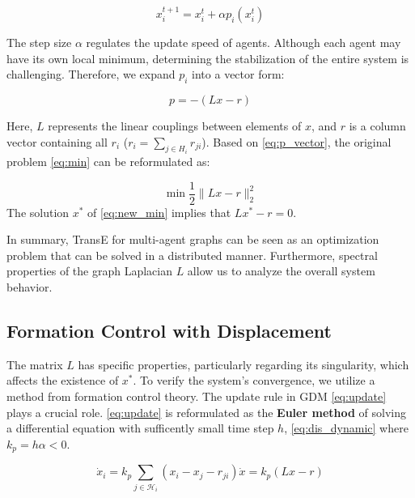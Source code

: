 \documentclass[letterpaper, 10 pt, conference]{ieeeconf}  %
\begin{document}
\begin{equation}
    x_{i}^{t+1} = x_i^t + \alpha p_i(x_i^t)
    \label{eq:update}
\end{equation}

The step size \( \alpha \) regulates the update speed of agents. Although each agent may have its own local minimum, determining the stabilization of the entire system is challenging. Therefore, we expand \( p_i \) into a vector form:

\begin{equation}
    p = - (Lx - r)
    \label{eq:p_vector}
\end{equation}

Here, \( L \) represents the linear couplings between elements of \( x \), and \( r \) is a column vector containing all \( r_i \) (\( r_i = \sum_{j \in H_i} r_{ji} \)). Based on \eqref{eq:p_vector}, the original problem \eqref{eq:min} can be reformulated as:

\begin{equation}
    \min \frac{1}{2} \|Lx - r\|_{2}^{2}
    \label{eq:new_min}
\end{equation}
\noindent The solution \( x^* \) of \eqref{eq:new_min} implies that \( Lx^* - r = 0 \). %

In summary, TransE for multi-agent graphs can be seen as an optimization problem that can be solved in a distributed manner. Furthermore, spectral properties of the graph Laplacian \( L \) allow us to analyze the overall system behavior.

\subsection{Formation Control with Displacement}

The matrix \( L \) has specific properties, particularly regarding its singularity, which affects the existence of \( x^* \). To verify the system’s convergence, we utilize a method from formation control theory. The update rule in GDM \eqref{eq:update} plays a crucial role. \eqref{eq:update} is reformulated as the \textbf{Euler method} of solving a differential equation with sufficently small time step $h$, \eqref{eq:dis_dynamic} where $k_p = h \alpha < 0$. 

\begin{subequations}\label{eq:fc_law}
\begin{equation}\label{eq:dis_dynamic}
    \dot{x}_i = k_p \sum_{j \in \mathcal{H}_i} (x_{i} - x_{j} - r_{ji})
\end{equation}
\begin{equation}\label{eq:total_dynamic}
    \dot{x} = k_p(Lx - r)
\end{equation}
\end{subequations}
\end{document}
